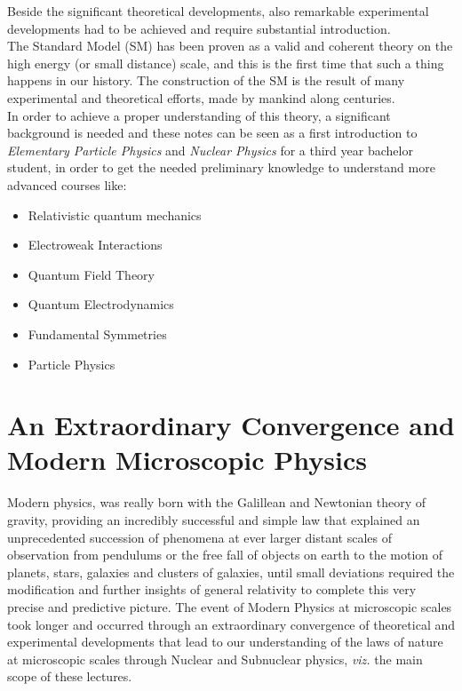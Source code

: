 Beside the significant theoretical developments, also remarkable experimental developments had to be achieved and require substantial introduction. \\

The Standard Model (SM) has been proven as a valid and coherent theory on the high energy (or small distance) scale, and this is the first time that such a thing happens in our history. The construction of the SM is the result of many experimental and theoretical efforts, made by mankind along centuries. \\

In order to achieve a proper understanding of this theory, a significant background is needed and these notes can be seen as a first introduction to \emph{Elementary Particle Physics} and \emph{Nuclear Physics} for a third year bachelor student, in order to get the needed preliminary knowledge to understand more advanced courses like:

\begin{itemize}
    \item Relativistic quantum mechanics
    \item Electroweak Interactions
    \item Quantum Field Theory
    \item Quantum Electrodynamics
    \item Fundamental Symmetries
    \item Particle Physics
    \end{itemize}
    
\section{An Extraordinary Convergence and Modern Microscopic Physics}

Modern physics, was really born with the Galillean and Newtonian theory of gravity, providing an incredibly successful and simple law that explained an unprecedented succession of phenomena at ever larger distant scales of observation from pendulums or the free fall of objects on earth to the motion of planets, stars, galaxies and clusters of galaxies, until small deviations required the modification and further insights of general relativity to complete this very precise and predictive picture. The event of Modern Physics at microscopic scales took longer and occurred through an extraordinary convergence of theoretical and experimental developments that lead to our understanding of the laws of nature at microscopic scales through Nuclear and Subnuclear physics, {\it viz.} the main scope of these lectures. \\

